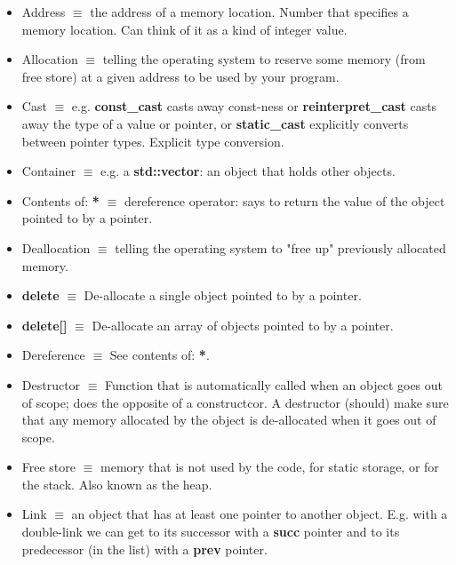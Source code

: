 \documentclass[12pt]{article}
\begin{document}
\begin{itemize}
\item Address $\equiv$ the address of a memory location. Number that specifies a memory location. Can think of it as a kind of integer value.

\item Allocation $\equiv$ telling the operating system to reserve some memory (from free store) at a given address to be used by your program.

\item Cast $\equiv$ e.g. \textbf{const\_cast} casts away const-ness or \textbf{reinterpret\_cast} casts away the type of a value or pointer, or \textbf{static\_cast} explicitly converts between pointer types. Explicit type conversion.

\item Container $\equiv$ e.g. a \textbf{std::vector}: an object that holds other objects.

\item Contents of: \textbf{*} $\equiv$ dereference operator: says to return the value of the object pointed to by a pointer.

\item Deallocation $\equiv$ telling the operating system to "free up" previously allocated memory.

\item \textbf{delete} $\equiv$ De-allocate a single object pointed to by a pointer.

\item \textbf{delete[]} $\equiv$ De-allocate an array of objects pointed to by a pointer.

\item Dereference $\equiv$ See contents of: \textbf{*}.

\item Destructor $\equiv$ Function that is automatically called when an object goes out of scope; does the opposite of a constructcor. A destructor (should) make sure that any memory allocated by the object is de-allocated when it goes out of scope.

\item Free store $\equiv$ memory that is not used by the code, for static storage, or for the stack. Also known as the heap.

\item Link $\equiv$ an object that has at least one pointer to another object. E.g. with a double-link we can get to its successor with a \textbf{succ} pointer and to its predecessor (in the list) with a \textbf{prev} pointer.


\end{itemize}
\end{document}
